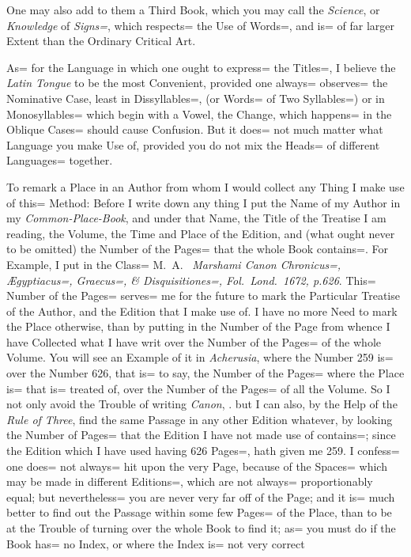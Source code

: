 One may also add to them a Third Book, which you may call the \emph{Science},
or \emph{Knowledge} of \emph{Signs=}, which respects= the Use of Words=,
and is= of far larger Extent than the Ordinary Critical Art.

As= for the Language in which one ought to express= the Titles=,
I believe the \emph{Latin Tongue} to be the most Convenient,
provided one always= observes= the Nominative Case, least in Dissyllables=,
(or Words= of Two Syllables=) or in Monosyllables= which begin with a Vowel,
the Change, which happens= in the Oblique Cases= should cause Confusion.
But it does= not much matter what Language you make Use of,
provided you do not mix the Heads= of different Languages= together.

To remark a Place in an Author from whom I would collect any Thing I make use of this= Method:
Before I write down any thing I put the Name of my Author in my \emph{Common-Place-Book},
and under that Name, the Title of the Treatise I am reading,
the Volume, the Time and Place of the Edition,
and (what ought never to be omitted) the Number of the Pages= that the whole Book contains=.
For Example, I put in the Class= M.\ A.\ %
\emph{Marshami Canon Chronicus=,
\AE gyptiacus=, Graecus=, \& Disquisitiones=,
Fol.\ Lond.\ 1672, p.626}.
This= Number of the Pages= serves= me for the future to mark the Particular Treatise of the Author,
and the Edition that I make use of.
I have no more Need to mark the Place otherwise,
than by putting in the Number of the Page from whence I have Collected what I have writ over the Number of the Pages= of the whole Volume.
You will see an Example of it in \emph{Acherusia},
where the Number 259 is= over the Number 626,
that is= to say, the Number of the Pages= where the Place is= that is= treated of,
over the Number of the Pages= of all the Volume.
So I not only avoid the Trouble of writing \emph{Canon}, \etc.
but I can also, by the Help of the \emph{Rule of Three},
find the same Passage in any other Edition whatever,
by looking the Number of Pages= that the Edition I have not made use of contains=;
since the Edition which I have used having 626 Pages=,
hath given me 259.
I confess= one does= not always= hit upon the very Page,
because of the Spaces= which may be made in different Editions=,
which are not always= proportionably equal;
but nevertheless= you are never very far off of the Page;
and it is= much better to find out the Passage within some few Pages= of the Place,
than to be at the Trouble of turning over the whole Book to find it;
as= you must do if the Book has= no Index,
or where the Index is= not very correct

